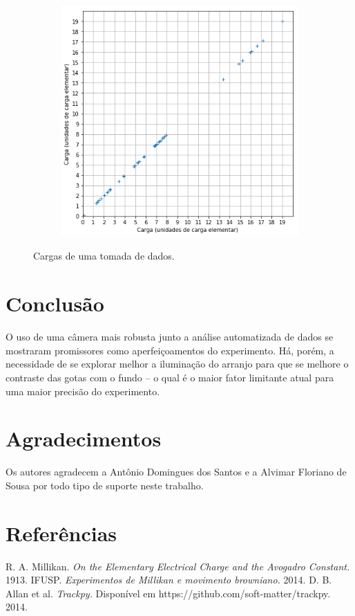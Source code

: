 \documentclass[twoside, twocolumn]{article}
\begin{document}
\begin{figure}[h]
	\centering
    \begin{subfigure}[b]{0.8\linewidth}
    	\includegraphics[width = \linewidth]{carga_x_cargas}
    \end{subfigure}
    \caption{Cargas de uma tomada de  dados.}
    \label{fig:resultado}
\end{figure}

\section{Conclusão}

O uso de uma câmera mais robusta junto a análise automatizada de dados se mostraram promissores como aperfeiçoamentos do experimento. Há, porém, a necessidade de se explorar melhor a iluminação do arranjo para que se melhore o contraste das gotas com o fundo -- o qual é o maior fator limitante atual para uma maior precisão do experimento.

\section{Agradecimentos}

Os autores agradecem a Antônio Domingues dos Santos e a Alvimar Floriano de Sousa por todo tipo de suporte neste trabalho.

\section{Referências}

\begin{thebibliography}{99} %
 R. A. Millikan. \emph{On the Elementary Electrical Charge and the Avogadro Constant.} 1913.
 IFUSP. \emph{Experimentos de Millikan e movimento browniano.} 2014.
 D. B. Allan et al. \emph{Trackpy.} Disponível em https://github.com/soft-matter/trackpy. 2014.
\end{thebibliography}
\end{document}
